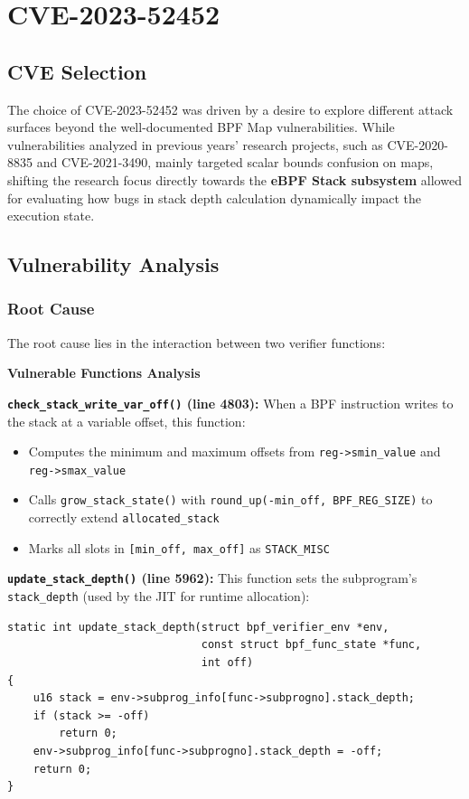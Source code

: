 \chapter{CVE-2023-52452}

\section{CVE Selection}
The choice of CVE-2023-52452 was driven by a desire to explore different attack surfaces beyond the well-documented BPF Map vulnerabilities. While vulnerabilities analyzed in previous years' research projects, such as CVE-2020-8835 and CVE-2021-3490, mainly targeted scalar bounds confusion on maps, shifting the research focus directly towards the \textbf{eBPF Stack subsystem} allowed for evaluating how bugs in stack depth calculation dynamically impact the execution state.

\section{Vulnerability Analysis}

\subsection{Root Cause}

The root cause lies in the interaction between two verifier functions:

\textbf{Vulnerable Functions Analysis}

\textbf{\texttt{check\_stack\_write\_var\_off()} (line 4803):}
When a BPF instruction writes to the stack at a variable offset, this function:
\begin{itemize}
    \item Computes the minimum and maximum offsets from \texttt{reg->smin\_value} and \texttt{reg->smax\_value}
    \item Calls \texttt{grow\_stack\_state()} with \texttt{round\_up(-min\_off, BPF\_REG\_SIZE)} to correctly extend \texttt{allocated\_\allowbreak stack}
    \item Marks all slots in \texttt{[min\_off, max\_off]} as \texttt{STACK\_MISC}
\end{itemize}

\textbf{\texttt{update\_stack\_depth()} (line 5962):}
This function sets the subprogram's \texttt{stack\_depth} (used by the JIT for runtime allocation):
\begin{lstlisting}[style=kernel]
static int update_stack_depth(struct bpf_verifier_env *env,
                              const struct bpf_func_state *func,
                              int off)
{
    u16 stack = env->subprog_info[func->subprogno].stack_depth;
    if (stack >= -off)
        return 0;
    env->subprog_info[func->subprogno].stack_depth = -off;
    return 0;
}
\end{lstlisting}

